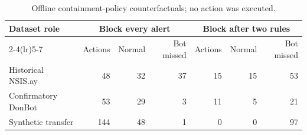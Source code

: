 \begin{table}[htbp]
\centering
\caption{Offline containment-policy counterfactuals; no action was executed.}
\label{tab:counterfactual-policies}
\small
\begin{tabular}{lrrrrrr}
\toprule
Dataset role & \multicolumn{3}{c}{Block every alert} & \multicolumn{3}{c}{Block after two rules} \\
\cmidrule(lr){2-4}\cmidrule(lr){5-7}
 & Actions & Normal & Bot missed & Actions & Normal & Bot missed \\
\midrule
Historical NSIS.ay & 48 & 32 & 37 & 15 & 15 & 53 \\
Confirmatory DonBot & 53 & 29 & 3 & 11 & 5 & 21 \\
Synthetic transfer & 144 & 48 & 1 & 0 & 0 & 97 \\
\bottomrule
\end{tabular}
\par{}
\par{}
\end{table}
